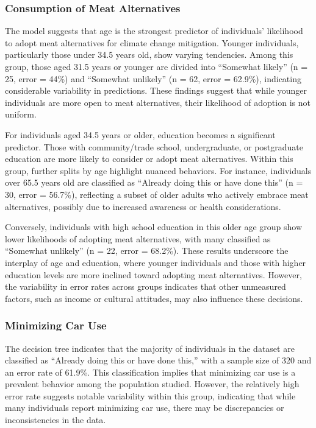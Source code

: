 \documentclass[
  letterpaper,
  DIV=11,
  numbers=noendperiod]{scrartcl}
\begin{document}
\subsubsection{Consumption of Meat
Alternatives}\label{consumption-of-meat-alternatives}

The model suggests that age is the strongest predictor of individuals'
likelihood to adopt meat alternatives for climate change mitigation.
Younger individuals, particularly those under 34.5 years old, show
varying tendencies. Among this group, those aged 31.5 years or younger
are divided into ``Somewhat likely'' (n = 25, error = 44\%) and
``Somewhat unlikely'' (n = 62, error = 62.9\%), indicating considerable
variability in predictions. These findings suggest that while younger
individuals are more open to meat alternatives, their likelihood of
adoption is not uniform.

For individuals aged 34.5 years or older, education becomes a
significant predictor. Those with community/trade school, undergraduate,
or postgraduate education are more likely to consider or adopt meat
alternatives. Within this group, further splits by age highlight nuanced
behaviors. For instance, individuals over 65.5 years old are classified
as ``Already doing this or have done this'' (n = 30, error = 56.7\%),
reflecting a subset of older adults who actively embrace meat
alternatives, possibly due to increased awareness or health
considerations.

Conversely, individuals with high school education in this older age
group show lower likelihoods of adopting meat alternatives, with many
classified as ``Somewhat unlikely'' (n = 22, error = 68.2\%). These
results underscore the interplay of age and education, where younger
individuals and those with higher education levels are more inclined
toward adopting meat alternatives. However, the variability in error
rates across groups indicates that other unmeasured factors, such as
income or cultural attitudes, may also influence these decisions.

\subsubsection{Minimizing Car Use}\label{minimizing-car-use}

The decision tree indicates that the majority of individuals in the
dataset are classified as ``Already doing this or have done this,'' with
a sample size of 320 and an error rate of 61.9\%. This classification
implies that minimizing car use is a prevalent behavior among the
population studied. However, the relatively high error rate suggests
notable variability within this group, indicating that while many
individuals report minimizing car use, there may be discrepancies or
inconsistencies in the data.
\end{document}
